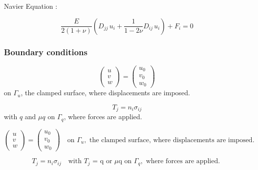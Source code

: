 \documentclass[12pt]{article}
\begin{document}
Navier Equation :

\begin{equation}
    \frac{E}{2(1+\nu)} \left( D_{jj} \, u_i + \frac{1}{1-2\nu} D_{ij} \, u_i \right) + F_i = 0
\end{equation}

\subsubsection{Boundary conditions}

\begin{equation}
    \begin{pmatrix}
    u \\
    v \\
    w
    \end{pmatrix} 
    = 
    \begin{pmatrix}
    u_0 \\
    v_0 \\
    w_0
    \end{pmatrix}
\end{equation}
on $\Gamma_u$, the clamped surface, where displacements are imposed.

\begin{equation}
    T_j = n_i \sigma_{ij}
\end{equation}
with $q$ and $\mu q$ on $\Gamma_q$, where forces are applied.

\begin{equation}
    \begin{pmatrix}
    u \\
    v \\
    w
    \end{pmatrix} 
    = 
    \begin{pmatrix}
    u_0 \\
    v_0 \\
    w_0
    \end{pmatrix}
    \quad \text{on } \Gamma_u, \text{ the clamped surface, where displacements are imposed.}
\end{equation}

\begin{equation}
    T_j = n_i \sigma_{ij} \quad \text{with } T_j \text{ = q or $\mu$q on } \Gamma_q, \text{ where forces are applied. }
\end{equation}
\end{document}
